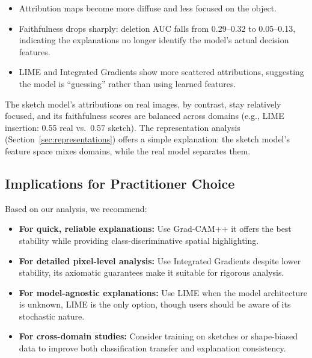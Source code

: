 \documentclass[12pt, a4paper]{article}
\begin{document}
\begin{itemize}[leftmargin=*]
    \item Attribution maps become more diffuse and less focused on the object.
    \item Faithfulness drops sharply: deletion AUC falls from 0.29--0.32 to
          0.05--0.13, indicating the explanations no longer identify the
          model's actual decision features.
    \item LIME and Integrated Gradients show more scattered attributions,
          suggesting the model is ``guessing'' rather than using learned
          features.
\end{itemize}

The sketch model's attributions on real images, by contrast, stay relatively
focused, and its faithfulness scores are balanced across domains (e.g., LIME
insertion: 0.55 real vs.\ 0.57 sketch).  The representation analysis
(Section~\ref{sec:representations}) offers a simple explanation: the sketch
model's feature space mixes domains, while the real model separates them.

\subsection{Implications for Practitioner Choice}

Based on our analysis, we recommend:

\begin{itemize}[leftmargin=*]
    \item \textbf{For quick, reliable explanations:} Use Grad-CAM++ it
          offers the best stability while providing class-discriminative
          spatial highlighting.
    \item \textbf{For detailed pixel-level analysis:} Use Integrated Gradients
           despite lower stability, its axiomatic guarantees make it
          suitable for rigorous analysis.
    \item \textbf{For model-agnostic explanations:} Use LIME  when the
          model architecture is unknown, LIME is the only option, though
          users should be aware of its stochastic nature.
    \item \textbf{For cross-domain studies:} Consider training on sketches or
          shape-biased data to improve both classification transfer and
          explanation consistency.
\end{itemize}


\end{document}
